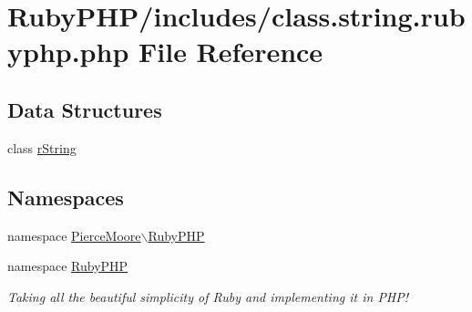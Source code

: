 \hypertarget{class_8string_8rubyphp_8php}{\section{Ruby\-P\-H\-P/includes/class.string.\-rubyphp.\-php File Reference}
\label{class_8string_8rubyphp_8php}
}
\subsection*{Data Structures}
\begin{DoxyCompactItemize}
\item 
class \hyperlink{class_pierce_moore_1_1_ruby_p_h_p_1_1r_string}{r\-String}
\end{DoxyCompactItemize}
\subsection*{Namespaces}
\begin{DoxyCompactItemize}
\item 
namespace \hyperlink{namespace_pierce_moore_1_1_ruby_p_h_p}{Pierce\-Moore$\backslash$\-Ruby\-P\-H\-P}
\item 
namespace \hyperlink{namespace_ruby_p_h_p}{Ruby\-P\-H\-P}
\begin{DoxyCompactList}\small\item\em Taking all the beautiful simplicity of Ruby and implementing it in P\-H\-P! \end{DoxyCompactList}\end{DoxyCompactItemize}

